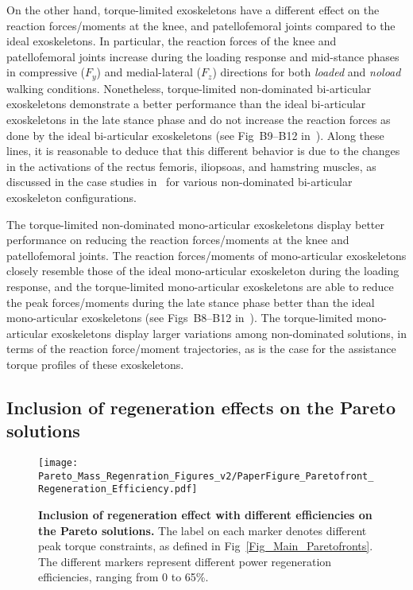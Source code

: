 \documentclass[10pt,letterpaper]{article}
\begin{document}
On the other hand, torque-limited exoskeletons have a different effect on the reaction forces/moments at the knee, and patellofemoral joints compared to the ideal exoskeletons. In particular, the reaction forces of the knee and patellofemoral joints increase during the loading response and mid-stance phases in compressive ($F_y$) and medial-lateral ($F_z$) directions for both \emph{loaded} and \emph{noload} walking conditions. Nonetheless,  torque-limited non-dominated bi-articular exoskeletons  demonstrate a better performance than the ideal bi-articular exoskeletons in the late stance phase and do not increase the reaction forces as done by the ideal bi-articular exoskeletons (see Fig~B9--B12 in~). Along these lines, it is reasonable to deduce that this different behavior is due to the changes in the activations of the rectus femoris, iliopsoas, and hamstring muscles, as discussed in the case studies in~\cite{Alibonab2021_thesis} for various non-dominated bi-articular exoskeleton configurations.

The torque-limited non-dominated mono-articular exoskeletons display better performance on reducing the reaction forces/moments at the knee and patellofemoral joints. The reaction forces/moments of  mono-articular exoskeletons closely resemble those of the ideal mono-articular exoskeleton during the loading response, and the torque-limited mono-articular exoskeletons are able to reduce the peak forces/moments during the late stance phase better than the ideal mono-articular exoskeletons (see Figs~B8--B12 in~). The torque-limited mono-articular exoskeletons display larger variations among non-dominated  solutions, in terms of the reaction force/moment trajectories, as is the case for the assistance torque profiles of these exoskeletons.

\bigskip
\subsection*{Inclusion of regeneration effects on the Pareto solutions}

\begin{figure*}[t!]
	\centering
	\texttt{[image: Pareto\_Mass\_Regenration\_Figures\_v2/PaperFigure\_Paretofront\_Regeneration\_Efficiency.pdf]}
	\vspace{-3mm}
	\caption{{\small\textbf{Inclusion of regeneration effect with different efficiencies on the Pareto solutions.} The label on each marker denotes different peak torque constraints, as defined in Fig~\ref{Fig_Main_Paretofronts}. The different markers represent different power regeneration efficiencies, ranging from 0 to 65\%. }} %
	\label{Fig_Paretofronts_Regeneration_Efficiency_Comparison}
\end{figure*}
\end{document}
